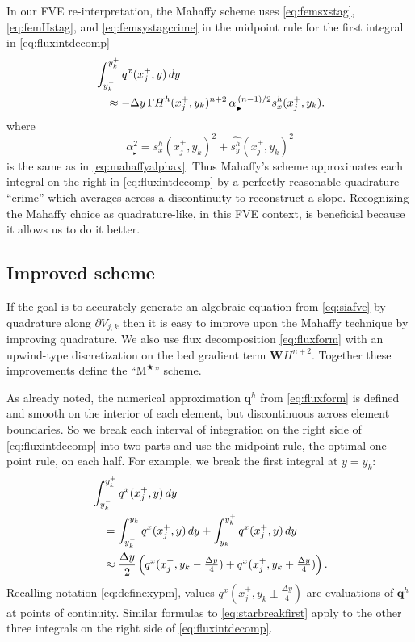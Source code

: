 \documentclass[review,letterpaper]{igs}
\newcommand\bq{\mathbf{q}}
\newcommand\bW{\mathbf{W}}
\newcommand{\Mstar}{$\text{M}^{\bigstar}$\xspace}
\newcommand\alpharight{\alpha_{{}_{\blacktriangleright}}}
\begin{document}
In our FVE re-interpretation, the Mahaffy scheme uses \eqref{eq:femsxstag}, \eqref{eq:femHstag}, and \eqref{eq:femsystagcrime} in the midpoint rule for the first integral in \eqref{eq:fluxintdecomp}
\begin{align}
&\int_{y_k^-}^{y_k^+} q^x(x_j^+,y)\,dy  \label{eq:femmahaffyfirstint} \\
  &\quad\approx - \Delta y\, \Gamma H^h(x_j^+,y_k)^{n+2} \,\alpharight^{\,(n-1)/2} s^h_x(x_j^+,y_k). \notag 
\end{align}
where
\begin{equation}
\alpharight^2 = s^h_x(x_j^+,y_k)^2 + \widehat{s^h_y}(x_j^+,y_k)^2
\end{equation}
is the same as in \eqref{eq:mahaffyalphax}.  Thus Mahaffy's scheme approximates each integral on the right in \eqref{eq:fluxintdecomp} by a perfectly-reasonable quadrature ``crime'' \citep[compare][]{Strang1972} which averages across a discontinuity to reconstruct a slope.  Recognizing the Mahaffy choice as quadrature-like, in this FVE context, is beneficial because it allows us to do it better.


\subsection{Improved scheme}

If the goal is to accurately-generate an algebraic equation from \eqref{eq:siafve} by quadrature along $\partial V_{j,k}$ then it is easy to improve upon the Mahaffy technique by improving quadrature.  We also use flux decomposition \eqref{eq:fluxform} with an upwind-type discretization on the bed gradient term $\bW H^{n+2}$.  Together these improvements define the ``\Mstar'' scheme.

As already noted, the numerical approximation $\bq^h$ from \eqref{eq:fluxform} is defined and smooth on the interior of each element, but discontinuous across element boundaries.  So we break each interval of integration on the right side of \eqref{eq:fluxintdecomp} into two parts and use the midpoint rule, the optimal one-point rule, on each half.  For example, we break the first integral at $y=y_k$:
\begin{align}
&\int_{y_k^-}^{y_k^+} q^x(x_j^+,y)\,dy  \label{eq:starbreakfirst} \\
  &\quad= \int_{y_k^-}^{y_k} q^x(x_j^+,y)\,dy + \int_{y_k}^{y_k^+} q^x(x_j^+,y)\,dy \notag \\
  &\quad\approx \frac{\Delta y}{2} \left(q^x(x_j^+,y_k-\tfrac{\Delta y}{4}) + q^x(x_j^+,y_k+\tfrac{\Delta y}{4})\right). \notag
\end{align}
Recalling notation \eqref{eq:definexypm}, values $q^x(x_j^+,y_k\pm\tfrac{\Delta y}{4})$ are evaluations of $\bq^h$ at points of continuity.  Similar formulas to \eqref{eq:starbreakfirst} apply to the other three integrals on the right side of \eqref{eq:fluxintdecomp}.
\end{document}
